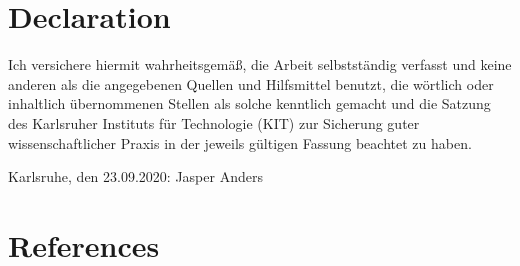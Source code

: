 \newpage

\hypertarget{declaration}{%
\section{Declaration}\label{declaration}}

Ich versichere hiermit wahrheitsgemäß, die Arbeit selbstständig verfasst
und keine anderen als die angegebenen Quellen und Hilfsmittel benutzt,
die wörtlich oder inhaltlich übernommenen Stellen als solche kenntlich
gemacht und die Satzung des Karlsruher Instituts für Technologie (KIT)
zur Sicherung guter wissenschaftlicher Praxis in der jeweils gültigen
Fassung beachtet zu haben.

Karlsruhe, den 23.09.2020: \hrulefill\newline
\phantom{Karlsruhe, den 23.09.2020: }Jasper Anders

\newpage

\hypertarget{references}{%
\section{References}\label{references}}

